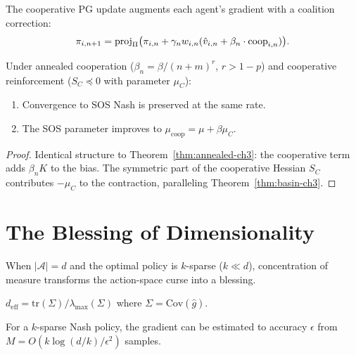 The cooperative PG update augments each agent's gradient with a coalition correction:
\begin{equation}
\label{eq:coop-update-ch3}
    \pi_{i,n+1} = \operatorname{proj}_\Pi\bigl(\pi_{i,n} + \gamma_n w_{i,n} (\hat{v}_{i,n} + \beta_n \cdot \text{coop}_{i,n})\bigr).
\end{equation}

\begin{theorem}
\label{thm:coop-conv-ch3}
Under annealed cooperation ($\beta_n = \beta/(n+m)^r$, $r > 1-p$) and cooperative reinforcement ($S_C \preceq 0$ with parameter $\mu_C$):
\begin{enumerate}[label=(\roman*)]
    \item Convergence to SOS Nash is preserved at the same rate.
    \item The SOS parameter improves to $\mu_{\text{coop}} = \mu + \beta \mu_C$.
\end{enumerate}
\end{theorem}

\begin{proof}
Identical structure to Theorem~\ref{thm:annealed-ch3}: the cooperative term adds $\beta_n K$ to the bias. The symmetric part of the cooperative Hessian $S_C$ contributes $-\mu_C$ to the contraction, paralleling Theorem~\ref{thm:basin-ch3}.
\end{proof}


\section{The Blessing of Dimensionality}
\label{sec:blessing}

When $|\mathcal{A}| = d$ and the optimal policy is $k$-sparse ($k \ll d$), concentration of measure transforms the action-space curse into a blessing.

\begin{definition}
\label{def:deff-ch3}
$d_{\text{eff}} = \text{tr}(\Sigma)/\lambda_{\max}(\Sigma)$ where $\Sigma = \text{Cov}(\hat{g})$.
\end{definition}

\begin{theorem}
\label{thm:sparse-recovery}
For a $k$-sparse Nash policy, the gradient can be estimated to accuracy $\epsilon$ from $M = O(k \log(d/k) / \epsilon^2)$ samples.
\end{theorem}

